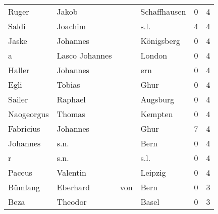\begin{center}
\begin{tiny}
\begin{longtabu}{llllrr}
                    Ruger &                              Jakob &             &                                Schaffhausen &          0 &         4 \\
                    Saldi &                            Joachim &             &                                        s.l. &          4 &         4 \\
                    Jaske &                           Johannes &             &                                  Königsberg &          0 &         4 \\
                        a &                     Lasco Johannes &             &                                      London &          0 &         4 \\
                   Haller &                           Johannes &             &                                         ern &          0 &         4 \\
                     Egli &                             Tobias &             &                                        Ghur &          0 &         4 \\
                   Sailer &                            Raphael &             &                                    Augsburg &          0 &         4 \\
               Naogeorgus &                             Thomas &             &                                     Kempten &          0 &         4 \\
                Fabricius &                           Johannes &             &                                        Ghur &          7 &         4 \\
                 Johannes &                               s.n. &             &                                        Bern &          0 &         4 \\
                        r &                               s.n. &             &                                        s.l. &          0 &         4 \\
                   Paceus &                           Valentin &             &                                     Leipzig &          0 &         4 \\
                  Bümlang &                           Eberhard &         von &                                        Bern &          0 &         3 \\
                     Beza &                            Theodor &             &                                       Basel &          0 &         3 \\

\end{longtabu}
\end{tiny}
\end{center}
